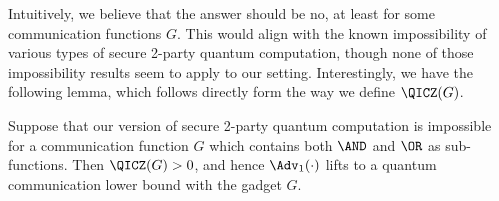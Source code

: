 Intuitively, we believe that the answer should be no,
at least for some communication functions $G$. This would
align with the known impossibility of various types of
secure 2-party quantum computation, though none of those
impossibility results seem to apply to our setting.
Interestingly, we have the following lemma, which
follows directly form the way we define $\QICZ(G)$.

\begin{lemma}
Suppose that our version of secure 2-party quantum computation
is impossible for a communication function $G$ which contains
both $\AND$ and $\OR$ as sub-functions. Then
$\QICZ(G)>0$, and hence $\Adv_1(\cdot)$ lifts to a
quantum communication lower bound with the gadget $G$.
\end{lemma}





















































































